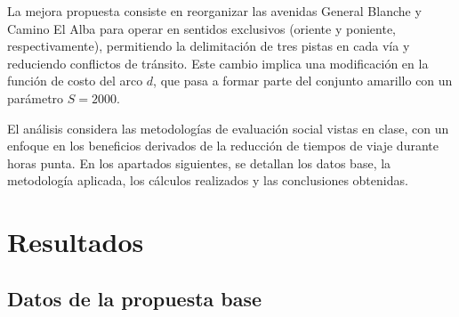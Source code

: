 \documentclass[letterpaper,12pt]{article}
\begin{document}
La mejora propuesta consiste en reorganizar las avenidas General Blanche y Camino El Alba para operar en sentidos exclusivos (oriente y poniente, respectivamente), permitiendo la delimitación de tres pistas en cada vía y reduciendo conflictos de tránsito. Este cambio implica una modificación en la función de costo del arco $d$, que pasa a formar parte del conjunto amarillo con un parámetro $S = 2000$.

El análisis considera las metodologías de evaluación social vistas en clase, con un enfoque en los beneficios derivados de la reducción de tiempos de viaje durante horas punta. En los apartados siguientes, se detallan los datos base, la metodología aplicada, los cálculos realizados y las conclusiones obtenidas.

\newpage
\section{Resultados}
\subsection{Datos de la propuesta base}
\end{document}
